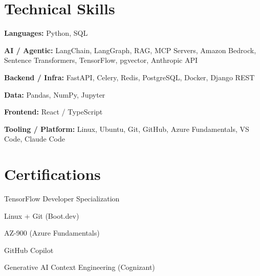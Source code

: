 \documentclass[10pt]{article}
\begin{document}
\section*{Technical Skills}
\noindent \textbf{Languages:} Python, SQL\par
\noindent \textbf{AI / Agentic:} LangChain, LangGraph, RAG, MCP Servers, Amazon Bedrock, Sentence Transformers, TensorFlow, pgvector, Anthropic API\par
\noindent \textbf{Backend / Infra:} FastAPI, Celery, Redis, PostgreSQL, Docker, Django REST\par
\noindent \textbf{Data:} Pandas, NumPy, Jupyter\par
\noindent \textbf{Frontend:} React / TypeScript\par
\noindent \textbf{Tooling / Platform:} Linux, Ubuntu, Git, GitHub, Azure Fundamentals, VS Code, Claude Code\par
\section*{Certifications}
\noindent TensorFlow Developer Specialization\par
\noindent Linux + Git (Boot.dev)\par
\noindent AZ-900 (Azure Fundamentals)\par
\noindent GitHub Copilot\par
\noindent Generative AI Context Engineering (Cognizant)\par
\end{document}
